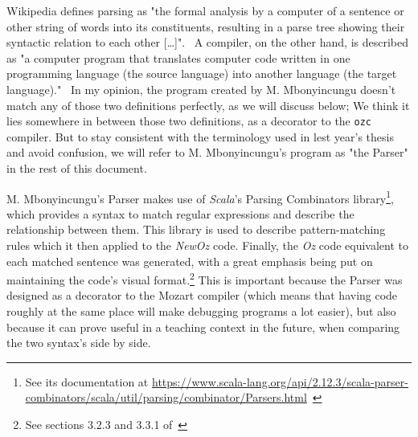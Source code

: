 Wikipedia defines parsing as "the formal analysis by a computer of a sentence or other string of words into its constituents, resulting in a parse tree showing their syntactic relation to each other [\ldots]".~\cite{wikiParser}
A compiler, on the other hand, is described as "a computer program that translates computer code written in one programming language (the source language) into another language (the target language)."~\cite{wikiCompiler}
In my opinion, the program created by M. Mbonyincungu doesn't match any of those two definitions perfectly, as we will discuss below;
We think it lies somewhere in between those two definitions, as a decorator to the \texttt{ozc} compiler.
But to stay consistent with the terminology used in lest year's thesis and avoid confusion, we will refer to M. Mbonyincungu's program as "the Parser" in the rest of this document.\newline

M. Mbonyincungu's Parser makes use of \textit{Scala}'s Parsing Combinators library\footnote{See its documentation at \url{https://www.scala-lang.org/api/2.12.3/scala-parser-combinators/scala/util/parsing/combinator/Parsers.html}~\cite{ScalaParsers}}, which provides a syntax to match regular expressions and describe the relationship between them.
This library is used to describe pattern-matching rules which it then applied to the \textit{NewOz} code.
Finally, the \textit{Oz} code equivalent to each matched sentence was generated, with a great emphasis being put on maintaining the code's visual format.\footnote{See sections 3.2.3 and 3.3.1 of~\cite{jpthesis}}
This is important because the Parser was designed as a decorator to the Mozart compiler (which means that having code roughly at the same place will make debugging programs a lot easier), but also because it can prove useful in a teaching context in the future, when comparing the two syntax's side by side.\newline

